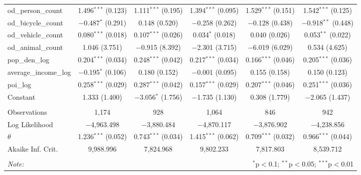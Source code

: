 \begin{table}[!htbp]
\begin{tabular}{@{\extracolsep{1pt}}lccccc}
  od\_person\_count & 1.496$^{***}$ (0.123) & 1.111$^{***}$ (0.195) & 1.394$^{***}$ (0.095) & 1.529$^{***}$ (0.151) & 1.542$^{***}$ (0.125) \\ 
  od\_bicycle\_count & $-$0.487$^{*}$ (0.291) & 0.148 (0.520) & $-$0.258 (0.262) & $-$0.128 (0.438) & $-$0.918$^{**}$ (0.448) \\ 
  od\_vehicle\_count & 0.080$^{***}$ (0.018) & 0.107$^{***}$ (0.026) & 0.034$^{*}$ (0.018) & 0.040 (0.026) & 0.053$^{**}$ (0.022) \\ 
  od\_animal\_count & 1.046 (3.751) & $-$0.915 (8.392) & $-$2.301 (3.715) & $-$6.019 (6.029) & 0.534 (4.625) \\ 
  pop\_den\_log & 0.204$^{***}$ (0.034) & 0.248$^{***}$ (0.042) & 0.217$^{***}$ (0.034) & 0.166$^{***}$ (0.046) & 0.205$^{***}$ (0.036) \\ 
  average\_income\_log & $-$0.195$^{*}$ (0.106) & 0.180 (0.152) & $-$0.001 (0.095) & 0.155 (0.158) & 0.150 (0.123) \\ 
  poi\_log & 0.258$^{***}$ (0.029) & 0.287$^{***}$ (0.042) & 0.157$^{***}$ (0.029) & 0.207$^{***}$ (0.046) & 0.251$^{***}$ (0.036) \\ 
  Constant & 1.333 (1.400) & $-$3.056$^{*}$ (1.756) & $-$1.735 (1.130) & 0.308 (1.779) & $-$2.065 (1.437) \\ 
 \hline \\[-1.8ex] 
Observations & 1,174 & 928 & 1,064 & 846 & 942 \\ 
Log Likelihood & $-$4,963.498 & $-$3,880.484 & $-$4,870.117 & $-$3,876.902 & $-$4,238.856 \\ 
$\theta$ & 1.236$^{***}$  (0.052) & 0.743$^{***}$  (0.034) & 1.415$^{***}$  (0.062) & 0.709$^{***}$  (0.032) & 0.966$^{***}$  (0.044) \\ 
Akaike Inf. Crit. & 9,988.996 & 7,824.968 & 9,802.233 & 7,817.803 & 8,539.712 \\ 
\hline 
\hline \\[-1.8ex] 
\textit{Note:}  & \multicolumn{5}{r}{$^{*}$p$<$0.1; $^{**}$p$<$0.05; $^{***}$p$<$0.01} \\ 
\end{tabular} 
\end{table} 
